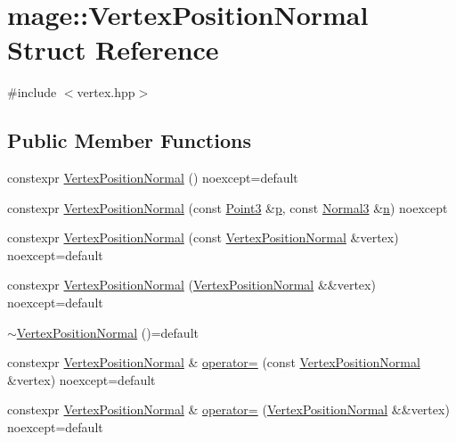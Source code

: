 \hypertarget{structmage_1_1_vertex_position_normal}{}\section{mage\+:\+:Vertex\+Position\+Normal Struct Reference}
\label{structmage_1_1_vertex_position_normal}


{\ttfamily \#include $<$vertex.\+hpp$>$}

\subsection*{Public Member Functions}
\begin{DoxyCompactItemize}
\item 
constexpr \hyperlink{structmage_1_1_vertex_position_normal_ab4a9d63bf68a8c3b867117eec117421e}{Vertex\+Position\+Normal} () noexcept=default
\item 
constexpr \hyperlink{structmage_1_1_vertex_position_normal_abfd18eec0148243507ba4d36b4298ea1}{Vertex\+Position\+Normal} (const \hyperlink{structmage_1_1_point3}{Point3} \&\hyperlink{structmage_1_1_vertex_position_normal_ac95e9941363ec5687f0bf21e59b83940}{p}, const \hyperlink{structmage_1_1_normal3}{Normal3} \&\hyperlink{structmage_1_1_vertex_position_normal_a09baa618081e66e21cdfe5752dbf8df6}{n}) noexcept
\item 
constexpr \hyperlink{structmage_1_1_vertex_position_normal_a0f96915185d1761854453c98303da317}{Vertex\+Position\+Normal} (const \hyperlink{structmage_1_1_vertex_position_normal}{Vertex\+Position\+Normal} \&vertex) noexcept=default
\item 
constexpr \hyperlink{structmage_1_1_vertex_position_normal_a52257e1fb23713a7ce228a9d1ba66fac}{Vertex\+Position\+Normal} (\hyperlink{structmage_1_1_vertex_position_normal}{Vertex\+Position\+Normal} \&\&vertex) noexcept=default
\item 
\hyperlink{structmage_1_1_vertex_position_normal_a664123217b7e8d18769ea46fc318e0c1}{$\sim$\+Vertex\+Position\+Normal} ()=default
\item 
constexpr \hyperlink{structmage_1_1_vertex_position_normal}{Vertex\+Position\+Normal} \& \hyperlink{structmage_1_1_vertex_position_normal_a61c158d1c031a965b3512e217ac1dcff}{operator=} (const \hyperlink{structmage_1_1_vertex_position_normal}{Vertex\+Position\+Normal} \&vertex) noexcept=default
\item 
constexpr \hyperlink{structmage_1_1_vertex_position_normal}{Vertex\+Position\+Normal} \& \hyperlink{structmage_1_1_vertex_position_normal_aac2b96802bda78c0f312985d9602b103}{operator=} (\hyperlink{structmage_1_1_vertex_position_normal}{Vertex\+Position\+Normal} \&\&vertex) noexcept=default
\end{DoxyCompactItemize}
